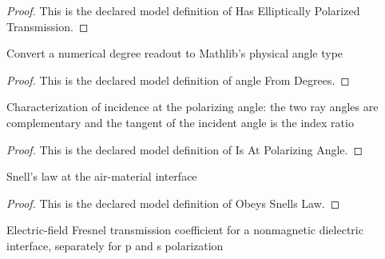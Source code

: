 \begin{proof}
  This is the declared model definition of Has Elliptically Polarized Transmission.
\end{proof}
\begin{definition}
  \label{def:physics:phyx-mini-0104:phyxminiproblems-problemphyxmini0104-anglefromdegrees}
  Convert a numerical degree readout to Mathlib's physical angle type
\end{definition}
\begin{proof}
  This is the declared model definition of angle From Degrees.
\end{proof}
\begin{definition}
  \label{def:physics:phyx-mini-0104:phyxminiproblems-problemphyxmini0104-isatpolarizingangle}
  Characterization of incidence at the polarizing angle: the two ray angles are complementary and the tangent of the incident angle is the index ratio
\end{definition}
\begin{proof}
  This is the declared model definition of Is At Polarizing Angle.
\end{proof}
\begin{definition}
  \label{def:physics:phyx-mini-0104:phyxminiproblems-problemphyxmini0104-obeyssnellslaw}
  Snell's law at the air-material interface
\end{definition}
\begin{proof}
  This is the declared model definition of Obeys Snells Law.
\end{proof}
\begin{definition}
  \label{def:physics:phyx-mini-0104:phyxminiproblems-problemphyxmini0104-fresneltransmissioncoefficient}
  Electric-field Fresnel transmission coefficient for a nonmagnetic dielectric interface, separately for p and s polarization
\end{definition}
